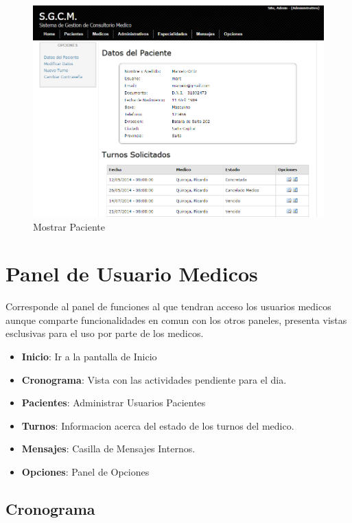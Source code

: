\begin{figure}[H]
    \centering
    \includegraphics[scale=0.5]{resourse/datos-paciente-a.png}
    \caption{Mostrar Paciente}
    \label{fig:613}
\end{figure}



\section{Panel de Usuario Medicos}

Corresponde al panel de funciones al que tendran acceso los usuarios medicos 
aunque comparte funcionalidades en comun con los otros paneles, presenta vistas
esclusivas para el uso por parte de los medicos.

\begin{itemize}
    \item \textbf{Inicio}: Ir a la pantalla de Inicio
    \item \textbf{Cronograma}: Vista con las actividades pendiente para el dia.
    \item \textbf{Pacientes}: Administrar Usuarios Pacientes
    \item \textbf{Turnos}: Informacion acerca del estado de los turnos del medico.
    \item \textbf{Mensajes}: Casilla de Mensajes Internos.
    \item \textbf{Opciones}: Panel de Opciones
\end{itemize}

\subsection{Cronograma}


